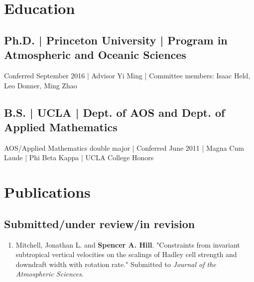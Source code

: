 \documentclass[12pt,letterpaper]{shillcv}
\begin{document}
\section*{Education}
\label{sec:org8dd93d9}
\subsection*{Ph.D. | Princeton University | Program in Atmospheric and Oceanic Sciences}
\label{sec:orgd284875}
Conferred September 2016 | Advisor Yi Ming | Committee members: Isaac
Held, Leo Donner, Ming Zhao
\subsection*{B.S. | UCLA | Dept. of AOS and Dept. of Applied Mathematics}
\label{sec:org8137b08}
AOS/Applied Mathematics double major | Conferred June 2011 |
Magna Cum Laude | Phi Beta Kappa | UCLA College Honors
\section*{Publications}
\label{sec:org7f917ac}
\subsection*{Submitted/under review/in revision}
\label{sec:org0539d6b}
\begin{enumerate}
\item Mitchell, Jonathan L. and \textbf{Spencer A. Hill}.  "Constraints from invariant
subtropical vertical velocities on the scalings of Hadley cell strength and
downdraft width with rotation rate."  Submitted to \emph{Journal of the Atmospheric
Sciences}.
\end{enumerate}
\end{document}
